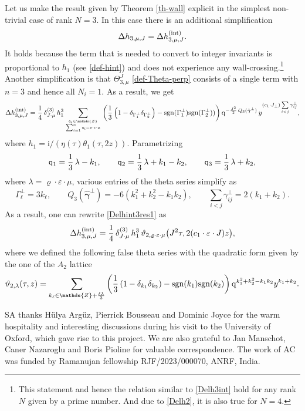 \documentclass[12pt,letterpaper]{JHEP3}
\def\be{\begin{equation}}
\def\ee{\end{equation}}
\newcommand{\sgn}{{\rm sgn}}
\def\({\left(}
\def\){\right)}
\def\vrh{\varrho}
\newcommand{\veps}{\varepsilon}
\newcommand{\I}{\mathrm{i}}
\newcommand{\qsf}{{\sf q}}
\newcommand{\IZ}{\mathds{Z}}
\newcommand{\bfgam}{{\boldsymbol \gamma}}
\def\bfhgam{\hat\bfgam}
\def\hint{h^{\rm (int)}}
\newcommand{\q}{\mathrm{q}}
\begin{document}
Let us make the result given by Theorem \ref{th-wall} explicit in the simplest non-trivial case of rank $N=3$.
In this case there is an additional simplification 
\be
\Delta h_{3,\mu,J}=\Delta \hint_{3,\mu,J}.
\label{Delh3int}
\ee 
It holds because the term that is needed to convert to integer invariants is proportional to $h_1$ (see \eqref{def-hint})
and does not experience any wall-crossing.\footnote{This statement and hence the relation similar to \eqref{Delh3int} 
	hold for any rank $N$ given by a prime number.
And due to \eqref{Delh2}, it is also true for $N=4$.} 
Another simplification is that $\Theta^J_{3,\mu}$ \eqref{def-Theta-perp} consists of a single term with $n=3$ and hence all $N_i=1$.
As a result, we get
\be 
\Delta \hint_{3,\mu,J}=\frac14\,\delta^{(3)}_{J\cdot \mu}\, h_1^3 
\sum_{\qsf_i\in \IZ\atop \sum_{i=1}^n \qsf_i=\vrh\cdot\veps\cdot\mu}
\(\frac13\(1-\delta_{\Gamma^\perp_1}\delta_{\Gamma^\perp_2}\)-\sgn(\Gamma^\perp_1) \sgn(\Gamma^\perp_2))\)
\q^{-\frac{J^2}{2}\,Q_3(\bfhgam^\perp)}\, y^{(c_1\cdot J_\perp)\sum\limits_{i<j}\gamma^\perp_{ij}},
\label{Delhint3res1}
\ee 
where $h_1=\I/(\eta(\tau)\theta_1(\tau,2z))$.
Parametrizing 
\be 
\qsf_1=\frac13\,\lambda-k_1,
\qquad
\qsf_2=\frac13\,\lambda+k_1-k_2,
\qquad
\qsf_3=\frac13\,\lambda+k_2,
\ee 
where $\lambda=\vrh\cdot\veps\cdot\mu$,
various entries of the theta series simplify as
\be 
\Gamma^\perp_\ell=3k_\ell, 
\qquad
Q_3(\bfhgam^\perp)=-6(k_1^2+k_2^2-k_1 k_2),
\qquad 
\sum\limits_{i<j}\gamma^\perp_{ij}=2(k_1+k_2).
\ee
As a result, one can rewrite \eqref{Delhint3res1} as 
\be
\Delta \hint_{3,\mu,J}=
\frac14\,\delta^{(3)}_{J\cdot \mu}\,h_1^3\, \vartheta_{2,\vrh\cdot\veps\cdot\mu}\bigl(J^2\tau,2(c_1\cdot \veps\cdot J)z \bigr),
\label{Delh3res}
\ee
where we defined the following false theta series with the quadratic form given by the one of the $A_2$ lattice
\be 
\vartheta_{2,\lambda}(\tau,z)=
\sum_{k_\ell\in\IZ+\frac{\ell\lambda}{3}} 
\(\frac{1}{3}\(1-\delta_{k_1}\delta_{k_2}\)-\sgn(k_1)\sgn(k_2)\)
\q^{k_1^2+k_2^2-k_1 k_2}
y^{k_1+k_2}.
\label{def-vthperp3A2}
\ee



\acknowledgments
SA thanks Hülya Argüz, Pierrick Bousseau and Dominic Joyce for the warm hospitality and interesting discussions during his visit  
to the University of Oxford, which gave rise to this project.
We are also grateful to Jan Manschot, Caner Nazaroglu and Boris Pioline for valuable correspondence. 
The work of AC was funded by Ramanujan fellowship RJF/2023/000070, ANRF, India.


\appendix
\end{document}
